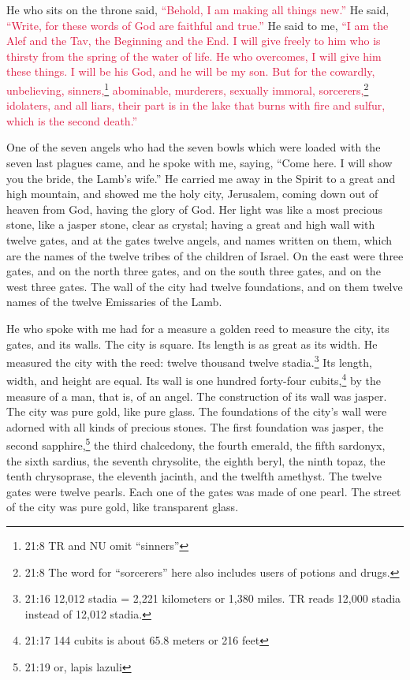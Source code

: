\myverse{}He who sits on the throne said,
\textcolor{crimson}{“Behold, I am making all things new.”} He said,
\textcolor{crimson}{“Write, for these words of God are faithful and true.”
}
\myverse{}He said to me,
\textcolor{crimson}{“I am the Alef and the Tav, the Beginning and the End. I will give freely to him who is thirsty from
	the spring of the water of life.
}
\myverse{}\textcolor{crimson}{He who overcomes, I will give him these things. I will be his God, and
	he will be my son.
}
\myverse{}\textcolor{crimson}{But for the cowardly, unbelieving, sinners,}\footnote{21:8 TR and NU omit “sinners”}
\textcolor{crimson}{abominable, murderers, sexually immoral, sorcerers,}\footnote{21:8 The word for “sorcerers” here also includes users of potions and drugs.}
\textcolor{crimson}{idolaters, and all liars, their part is in the lake that burns with fire and sulfur, which is the
	second death.”}

\myverse{}One of the seven angels who had the seven bowls which were loaded
with the seven last plagues came, and he spoke with me, saying, “Come here. I will show you the bride,
the Lamb’s wife.”
\myverse{}He carried me away in the Spirit to a great and high mountain, and showed
me the holy city, Jerusalem, coming down out of heaven from God,
\myverse{}having the glory of God. Her light was like a most precious stone, like a
jasper stone, clear as crystal;
\myverse{}having a great and high wall with twelve gates, and at the gates twelve angels,
and names written on them, which are the names of the twelve tribes of the children of Israel.
\myverse{}On the east were three gates, and on the north three gates, and on the south
three gates, and on the west three gates.
\myverse{}The wall of the city had twelve foundations, and on them twelve names of
the twelve Emissaries of the Lamb.

\myverse{}He who spoke with me had for a measure a golden reed to measure
the city, its gates, and its walls.
\myverse{}The city is square. Its length is as great as its width. He measured the
city with the reed: twelve thousand twelve stadia.\footnote{21:16 12,012 stadia = 2,221 kilometers or 1,380 miles. TR reads 12,000 stadia instead of 12,012 stadia.}
Its length, width, and height are equal.
\myverse{}Its wall is one hundred forty-four cubits,\footnote{21:17 144 cubits is about 65.8 meters or 216 feet} by the measure of a man, that is, of an
angel.
\myverse{}The construction of its wall was jasper. The city was pure gold, like pure
glass.
\myverse{}The foundations of the city’s wall were adorned with all kinds of precious
stones. The first foundation was jasper, the second sapphire,\footnote{21:19 or, lapis lazuli} the third chalcedony, the fourth emerald,
\myverse{}the fifth sardonyx, the sixth sardius, the seventh chrysolite, the eighth
beryl, the ninth topaz, the tenth chrysoprase, the eleventh jacinth, and the twelfth amethyst.
\myverse{}The twelve gates were twelve pearls. Each one of the gates was made of one
pearl. The street of the city was pure gold, like transparent glass.

